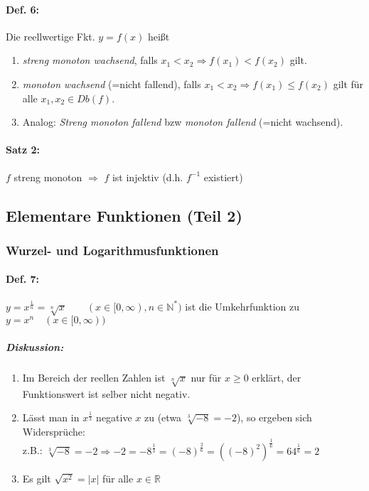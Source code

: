 \paragraph{Def. 6:} \parskp
Die reellwertige Fkt. $y=f(x)$ heißt
\begin{enumerate}[label=\alph*.)]
\item \emph{streng monoton wachsend}, falls $x_1<x_2 \Rightarrow f(x_1)<f(x_2)$ gilt.
\item \emph{monoton wachsend} (=nicht fallend), falls $x_1<x_2 \Rightarrow f(x_1) \leq f(x_2)$ gilt für alle $x_1, x_2 \in Db(f)$.
\item Analog: \emph{Streng monoton fallend} bzw \emph{monoton fallend} (=nicht wachsend).
\end{enumerate}

\paragraph{Satz 2:} \parskp
$f$ streng monoton $\Rightarrow$ $f$ ist injektiv (d.h. $f^{-1}$ existiert)

\subsection{Elementare Funktionen (Teil 2)}

\subsubsection{Wurzel- und Logarithmusfunktionen}
\paragraph{Def. 7:} \parskp
$y=x^{\frac{1}{n}}=\sqrt[n]{x} \qquad (x\in [0,\infty), n \in \mathbb{N}^*)$ ist die Umkehrfunktion zu $y=x^n \quad (x \in [0, \infty))$

\subparagraph{Diskussion: }
\begin{enumerate}
\item Im Bereich der reellen Zahlen ist $\sqrt[n]{x}$ nur für $x\geq 0 $ erklärt, der Funktionswert ist selber nicht negativ.
\item Lässt man in $x^{\frac{1}{3}}$ negative $x$ zu (etwa $\sqrt[3]{-8}=-2$), so ergeben sich Widersprüche:\\
z.B.: $\sqrt[3]{-8}=-2 \Rightarrow -2=-8^{\frac{1}{3}}=(-8)^{\frac{2}{6}}=\left((-8)^2\right)^{\frac{1}{6}}=64^{\frac{1}{6}}=2$
\item Es gilt $\sqrt{x^2}=|x|$ für alle $x \in \mathbb{R}$
\end{enumerate}

